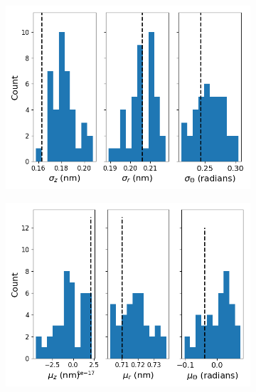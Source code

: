 \documentclass[journal=jpcbfk,manuscript=article]{achemso}
\begin{document}
  \begin{figure}[!htb]
  \centering
  \begin{subfigure}{0.49\textwidth}
  \includegraphics[width=\textwidth]{offset_ensemble_stds.png}
  \caption{}\label{fig:offset_ensemble_stds}
  \end{subfigure}
  \begin{subfigure}{0.49\textwidth}
  \includegraphics[width=\textwidth]{offset_ensemble_means.png}
  \caption{}\label{fig:offset_ensemble_means}
  \end{subfigure}

\end{figure}
\end{document}

